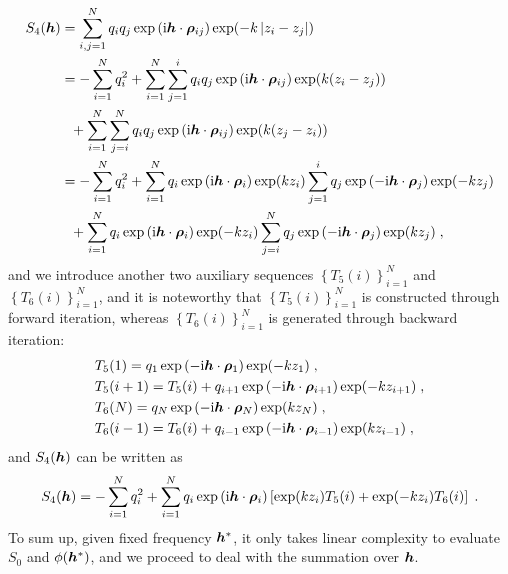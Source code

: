 \begin{align*}
S_4(\boldsymbol{h})&=\sum_{i,j=1}^Nq_iq_j  \exp{(\mathrm{i} \boldsymbol{h} \cdot \boldsymbol{\rho}_{ij})}\exp(-k\left\lvert z_i-z_j\right\rvert)\\
&=-\sum_{i=1}^Nq_i^2+\sum_{i=1}^N \sum_{j=1}^iq_iq_j  \exp{(\mathrm{i} \boldsymbol{h} \cdot \boldsymbol{\rho}_{ij})}\exp(k(z_i-z_j))\\
&~~+\sum_{i=1}^N \sum_{j=i}^Nq_iq_j  \exp{(\mathrm{i} \boldsymbol{h} \cdot \boldsymbol{\rho}_{ij})}\exp(k(z_j-z_i))\\
&= -\sum_{i=1}^Nq_i^2+\sum_{i=1}^N q_i\exp{(\mathrm{i} \boldsymbol{h} \cdot \boldsymbol{\rho}_{i})}\exp(kz_i)\sum_{j=1}^iq_j\exp{(-\mathrm{i} \boldsymbol{h} \cdot \boldsymbol{\rho}_{j})}\exp(-kz_j)\\
&~~+\sum_{i=1}^N q_i\exp{(\mathrm{i} \boldsymbol{h} \cdot \boldsymbol{\rho}_{i})}\exp(-kz_i)\sum_{j=i}^Nq_j\exp{(-\mathrm{i} \boldsymbol{h} \cdot \boldsymbol{\rho}_{j})}\exp(kz_j)\;,
\end{align*}
and we introduce another two auxiliary sequences  $\left\{T_5(i)\right\}_{i=1}^N$ and $\left\{T_6(i)\right\}_{i=1}^N$, and it is noteworthy that $\left\{T_5(i)\right\}_{i=1}^N$ is  constructed through forward iteration, whereas  $\left\{T_6(i)\right\}_{i=1}^N$   is generated through backward iteration:
\begin{align*}
    &T_5(1)=q_1\exp{(-\mathrm{i} \boldsymbol{h} \cdot \boldsymbol{\rho}_{1})}\exp(-kz_1)\;,\\
    &T_5(i+1)=T_5(i)+q_{i+1}\exp{(-\mathrm{i} \boldsymbol{h} \cdot \boldsymbol{\rho}_{i+1})}\exp(-kz_{i+1})\;,\\
    &T_6(N)=q_N\exp{(-\mathrm{i} \boldsymbol{h} \cdot \boldsymbol{\rho}_{N})}\exp(kz_N)\;,\\
    &T_6(i-1)=T_6(i)+q_{i-1}\exp{(-\mathrm{i} \boldsymbol{h} \cdot \boldsymbol{\rho}_{i-1})}\exp(kz_{i-1})\;,
\end{align*}
and $S_4(\boldsymbol{h})$ can be written as
\[
S_4(\boldsymbol{h})= -\sum_{i=1}^Nq_i^2+ \sum_{i=1}^N q_i\exp{(\mathrm{i} \boldsymbol{h} \cdot \boldsymbol{\rho}_{i})}\left[\exp(kz_i)T_5(i)+\exp(-kz_i)T_6(i)\right]\;.
\]
To sum up, given fixed frequency $\boldsymbol{h}^\ast$, it only takes  linear complexity to evaluate $S_0$ and $\phi(\boldsymbol{h}^\ast)$, and we proceed to deal with the   summation over $\boldsymbol{h}$. 

